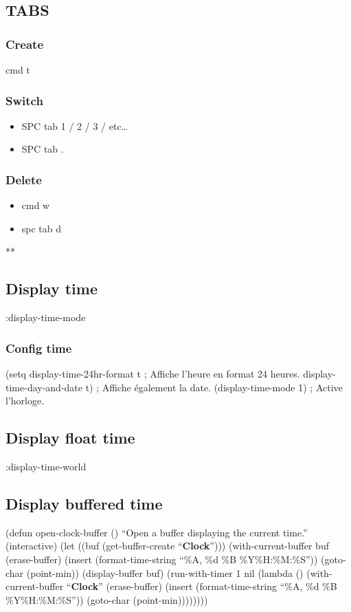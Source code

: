 \documentclass[11pt]{article}
\begin{document}
\subsection*{TABS}
\label{sec:orgf1fbb6f}
\subsubsection*{Create}
\label{sec:org14b9536}
cmd t
\subsubsection*{Switch}
\label{sec:org04830c9}
\begin{itemize}
\item SPC tab 1 / 2 / 3 / etc\ldots{}
\item SPC tab .
\end{itemize}
\subsubsection*{Delete}
\label{sec:orgba016ad}
\begin{itemize}
\item cmd w
\item spc tab d
\end{itemize}
**
\subsection*{Display time}
\label{sec:org1c50acd}
:display-time-mode
\subsubsection*{Config time}
\label{sec:org1e2a82e}
(setq display-time-24hr-format t   ; Affiche l'heure en format 24 heures.
      display-time-day-and-date t) ; Affiche également la date.
(display-time-mode 1)              ; Active l'horloge.
\subsection*{Display float time}
\label{sec:org2c63a44}
:display-time-world
\subsection*{Display buffered time}
\label{sec:orge5c1c91}
(defun open-clock-buffer ()
  ``Open a buffer displaying the current time.''
  (interactive)
  (let ((buf (get-buffer-create ``\textbf{Clock}'')))
    (with-current-buffer buf
      (erase-buffer)
      (insert (format-time-string ``\%A, \%d \%B \%Y\n\%H:\%M:\%S''))
      (goto-char (point-min))
      (display-buffer buf)
      (run-with-timer 1 nil (lambda ()
                              (with-current-buffer ``\textbf{Clock}''
                                (erase-buffer)
                                (insert (format-time-string ``\%A, \%d \%B \%Y\n\%H:\%M:\%S''))
                                (goto-char (point-min))))))))
\end{document}
